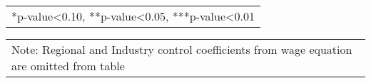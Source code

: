 \documentclass[12pt]{report}
\begin{document}
\begin{sidewaystable}
\begin{tabular}{lc|c|c|c|c|c|c|c}
\hline
\hline
\end{tabular}
\begin{tabular}{p{6.25in}}\footnotesize{
*p-value<0.10, **p-value<0.05, ***p-value<0.01}\\
\end{tabular}
\begin{tabular}{p{6.25in}}\footnotesize{
Note: Regional and Industry control coefficients from wage equation are omitted from table}\\
\end{tabular}
\end{sidewaystable}

\begin{comment}R-sq & 0.2891 & -0.2320 & -0.2593 & 0.2805 & 0.3137 & -0.4428 & -1.333 & -0.2120\\
\end{comment}

\newpage
\end{document}
